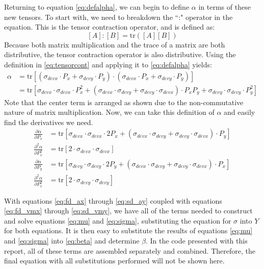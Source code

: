 Returning to equation \ref{eq:defalpha}, we can begin to define $\alpha$ in terms of these new tensors. To start with, we need to breakdown the ``:" operator in the equation. This is the tensor contraction operator, and is defined as: 
   \begin{equation}
	   \left[A\right] : \left[B\right] = \mathrm{tr}(\left[A\right]\left[B\right])
	   \label{eq:tensorcont}
   \end{equation}
Because both matrix multiplication and the trace of a matrix are both distributive, the tensor contraction operator is also distributive. Using the definition in \ref{eq:tensorcont} and applying it to \ref{eq:defalpha} yields: 
   \begin{align}
	   \alpha &= \mathrm{tr}\left[(\sigma_{devx} \cdot P_x + \sigma_{devy} \cdot P_y) \cdot
		    (\sigma_{devx} \cdot P_x + \sigma_{devy} \cdot P_y)\right]\nonumber\\
		  &= \mathrm{tr}\left[\sigma_{devx} \cdot \sigma_{devx} \cdot P_x^2 + \left( 
		     \sigma_{devx} \cdot \sigma_{devy} + \sigma_{devy} \cdot \sigma_{devx} \right) \cdot P_x P_y + 
		     \sigma_{devy} \cdot \sigma_{devy} \cdot P_y^2 \right]
   \end{align}
Note that the center term is arranged as shown due to the non-commutative nature of matrix multiplication.
Now, we can take this definition of $\alpha$ and easily find the derivatives we need.
   \begin{align}
	   \frac{\partial \alpha}{\partial P_x} &= 
	   	\mathrm{tr}\left[\sigma_{devx} \cdot \sigma_{devx} \cdot 2P_x + \left( 
		     \sigma_{devx} \cdot \sigma_{devy} + \sigma_{devy} \cdot \sigma_{devx} \right) \cdot P_y \right]\label{eq:fd_ax}\\
	   \frac{\partial^2 \alpha}{\partial P_x^2} &=
	   	\mathrm{tr}\left[2 \cdot \sigma_{devx} \cdot \sigma_{devx} \right]\\
	   \frac{\partial \alpha}{\partial P_y} &= 
	   	\mathrm{tr}\left[\sigma_{devy} \cdot \sigma_{devy} \cdot 2P_y + \left( 
		     \sigma_{devx} \cdot \sigma_{devy} + \sigma_{devy} \cdot \sigma_{devx} \right) \cdot P_x \right]\\
	   \frac{\partial^2 \alpha}{\partial P_x^2} &=
		\mathrm{tr}\left[2 \cdot \sigma_{devy} \cdot \sigma_{devy} \right]\label{eq:sd_ay}
   \end{align}

   With equations \ref{eq:fd_ax} through \ref{eq:sd_ay} coupled with equations \ref{eq:fd_vmx} through \ref{eq:sd_vmy}, we have all of the terms needed to construct and solve equations \ref{eq:mu} and \ref{eq:sigma}, substituting the equation for $\sigma$ into $Y$ for both equations. It is then easy to substitute the results of equations \ref{eq:mu} and \ref{eq:sigma} into \ref{eq:beta} and determine $\beta$.  In the code presented with this report, all of these terms are assembled separately and combined. Therefore, the final equation with all substitutions performed will not be shown here.

